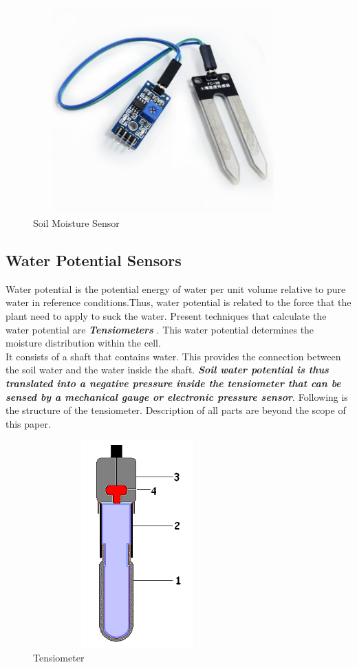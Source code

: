 \documentclass[11pt]{article}
\begin{document}
\begin{figure}[!h]
  \centering
    \vspace*{0 cm}
  \includegraphics[height=80mm,width=100mm]{p1.PNG}
    \caption{Soil Moisture Sensor}
  \label{fig:Soil Moisture Sensor}
\end{figure}

\subsection{Water Potential Sensors}
Water potential is the potential energy of water per unit volume relative to pure water in reference conditions.Thus, water potential is related to the force that the plant need to apply to suck the water. Present techniques that calculate the water potential are \textbf{\textit{Tensiometers}} \cite{ref4}. This water potential determines the moisture distribution within the cell. \\ It consists of a shaft that contains water. This provides the connection between the soil water and the water inside the shaft. 
\textit{\textbf{Soil water potential is thus translated into a negative pressure inside the tensiometer that can be sensed by a mechanical gauge or electronic pressure sensor}}. Following is the structure of the tensiometer. Description of all parts are beyond the scope of this paper.

\begin{figure}[!h]
  \centering
    \vspace*{0 cm}
  \includegraphics[height=80mm,width=80mm]{p2.png}
    \caption{Tensiometer}
  \label{fig:Soil Moisture Sensor}
\end{figure}
\end{document}
